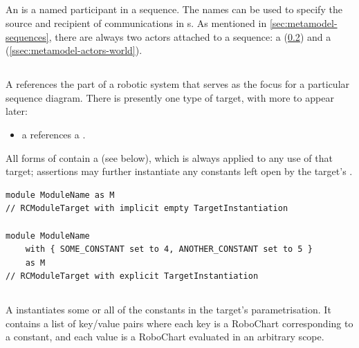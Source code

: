 \subsection{\mactor}

An \mactor{} is a named participant in a sequence.  The names can be used to
specify the source and recipient of communications in \mmessagespec{}s.
As mentioned in
\cref{sec:metamodel-sequences}, there are always two actors
attached to a sequence: a \mtarget{} (\cref{ssec:metamodel-actors-target})
and a \mworld{} (\cref{ssec:metamodel-actors-world}).

\subsection{\mtarget}\label{ssec:metamodel-actors-target}

A \mtarget{} references the part of a robotic system that serves as the focus
for a particular sequence diagram.  There is
presently one type of target, with more to appear later:

\begin{itemize}
\item
	a \mrcmoduletarget{} references a \mrcmodule.
\end{itemize}

All forms of \mtarget{} contain a \mtargetinstantiation{} (see below), which
is always applied to any use of that target; assertions may further instantiate
any constants left open by the target's \mtargetinstantiation.

\begin{lstlisting}[style=Example]
module ModuleName as M
// RCModuleTarget with implicit empty TargetInstantiation

module ModuleName
    with { SOME_CONSTANT set to 4, ANOTHER_CONSTANT set to 5 }
    as M
// RCModuleTarget with explicit TargetInstantiation
\end{lstlisting}

\subsection{\mtargetinstantiation}

A \mtargetinstantiation{} instantiates some or all of the constants in the
target's parametrisation.  It contains a list of key/value pairs where each key
is a RoboChart \mvariable{} corresponding to a constant, and each value is a
RoboChart \mexpression{} evaluated in an arbitrary  scope.

